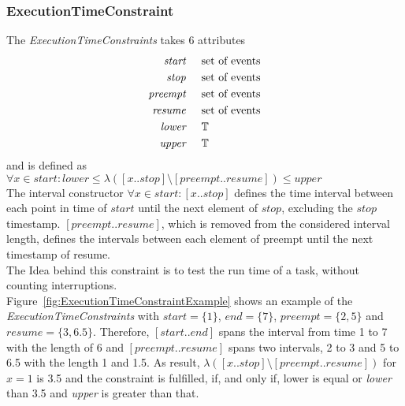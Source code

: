 	\subsubsection{ExecutionTimeConstraint}
		The \emph{ExecutionTimeConstraints} takes 6 attributes
		\begin{align*}
			\emph{start} & \hspace{.5cm}\text{set of events}\\
			\emph{stop} & \hspace{.5cm}\text{set of events}\\
			\emph{preempt} & \hspace{.5cm}\text{set of events}\\
			\emph{resume} & \hspace{.5cm}\text{set of events}\\
			\emph{lower} & \hspace{.5cm}\mathbb{T}\\
			\emph{upper} & \hspace{.5cm}\mathbb{T}\\
		\end{align*}
		and is defined as\\[10pt]
		\begin{math}
			\forall x\in start: lower\leq \lambda([x..stop]\setminus[preempt..resume]) \leq upper
		\end{math}\\[10pt]
		The interval constructor $\forall x\in start: [x..stop]$ defines the time interval between each point in time of $start$ until the next element of $stop$, excluding the $stop$ timestamp. $[preempt..resume]$, which is removed from the considered interval length, defines the intervals between each element of preempt until the next timestamp of resume.\\
		The Idea behind this constraint is to test the run time of a task, without counting interruptions.\\
		Figure~\ref{fig:ExecutionTimeConstraintExample} shows an example of the \emph{ExecutionTimeConstraints} with $start=\{1\}$, $end=\{7\}$, $preempt=\{2, 5\}$ and $resume = \{3, 6.5\}$. Therefore, $[start..end]$ spans the interval from time 1 to 7 with the length of 6 and $[preempt..resume]$ spans two intervals, 2 to 3 and 5 to 6.5 with the length 1 and 1.5. As result, $\lambda([x..stop]\setminus[preempt..resume])$ for $x = 1$ is 3.5 and the constraint is fulfilled, if, and only if, lower is equal or \emph{lower} than 3.5 and \emph{upper} is greater than that.\\
